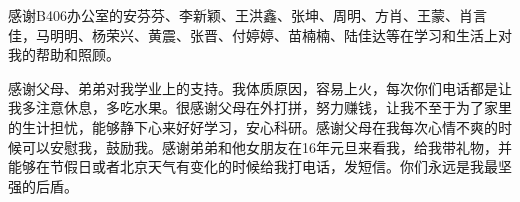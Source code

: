 \begin{thanks}
感谢B406办公室的安芬芬、李新颖、王洪鑫、张坤、周明、方肖、王蒙、肖言佳，马明明、杨荣兴、黄震、张晋、付婷婷、苗楠楠、陆佳达等在学习和生活上对我的帮助和照顾。

感谢父母、弟弟对我学业上的支持。我体质原因，容易上火，每次你们电话都是让我多注意休息，多吃水果。很感谢父母在外打拼，努力赚钱，让我不至于为了家里的生计担忧，能够静下心来好好学习，安心科研。感谢父母在我每次心情不爽的时候可以安慰我，鼓励我。感谢弟弟和他女朋友在16年元旦来看我，给我带礼物，并能够在节假日或者北京天气有变化的时候给我打电话，发短信。你们永远是我最坚强的后盾。


\end{thanks}













